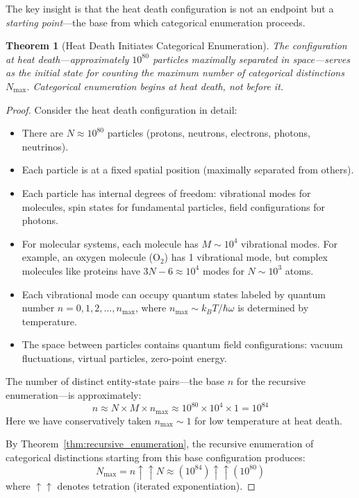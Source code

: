 \documentclass[12pt,a4paper]{article}
\newtheorem{theorem}{Theorem}[section]
\theoremstyle{definition}
\theoremstyle{remark}
\newcommand{\Nmax}{N_{\text{max}}}
\begin{document}
The key insight is that the heat death configuration is not an endpoint but a \emph{starting point}—the base from which categorical enumeration proceeds.

\begin{theorem}[Heat Death Initiates Categorical Enumeration]
\label{thm:enumeration_begins}
The configuration at heat death—approximately $10^{80}$ particles maximally separated in space—serves as the initial state for counting the maximum number of categorical distinctions $\Nmax$. Categorical enumeration begins at heat death, not before it.
\end{theorem}

\begin{proof}
Consider the heat death configuration in detail:
\begin{itemize}
    \item There are $N \approx 10^{80}$ particles (protons, neutrons, electrons, photons, neutrinos).
    \item Each particle is at a fixed spatial position (maximally separated from others).
    \item Each particle has internal degrees of freedom: vibrational modes for molecules, spin states for fundamental particles, field configurations for photons.
    \item For molecular systems, each molecule has $M \sim 10^4$ vibrational modes. For example, an oxygen molecule (O$_2$) has 1 vibrational mode, but complex molecules like proteins have $3N - 6 \approx 10^4$ modes for $N \sim 10^3$ atoms.
    \item Each vibrational mode can occupy quantum states labeled by quantum number $n = 0, 1, 2, \ldots, n_{\max}$, where $n_{\max} \sim k_B T / \hbar\omega$ is determined by temperature.
    \item The space between particles contains quantum field configurations: vacuum fluctuations, virtual particles, zero-point energy.
\end{itemize}

The number of distinct entity-state pairs—the base $n$ for the recursive enumeration—is approximately:
\begin{equation}
n \approx N \times M \times n_{\max} \approx 10^{80} \times 10^4 \times 1 = 10^{84}
\end{equation}
Here we have conservatively taken $n_{\max} \sim 1$ for low temperature at heat death.

By Theorem~\ref{thm:recursive_enumeration}, the recursive enumeration of categorical distinctions starting from this base configuration produces:
\begin{equation}
\Nmax = n \uparrow\uparrow N \approx (10^{84}) \uparrow\uparrow (10^{80})
\end{equation}
where $\uparrow\uparrow$ denotes tetration (iterated exponentiation).


\end{proof}
\end{document}
